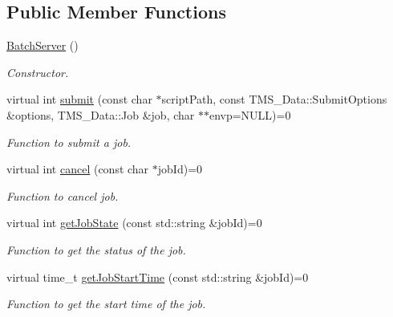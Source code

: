 \subsection*{Public Member Functions}
\begin{DoxyCompactItemize}
\item 
\hypertarget{classBatchServer_a7bacd852b35c5376a3d23a5744f7cf3f}{
\hyperlink{classBatchServer_a7bacd852b35c5376a3d23a5744f7cf3f}{BatchServer} ()}
\label{classBatchServer_a7bacd852b35c5376a3d23a5744f7cf3f}

\begin{DoxyCompactList}\small\item\em Constructor. \item\end{DoxyCompactList}\item 
virtual int \hyperlink{classBatchServer_a078c0f8605e770c02b8eca0351526f59}{submit} (const char $\ast$scriptPath, const TMS\_\-Data::SubmitOptions \&options, TMS\_\-Data::Job \&job, char $\ast$$\ast$envp=NULL)=0
\begin{DoxyCompactList}\small\item\em Function to submit a job. \item\end{DoxyCompactList}\item 
virtual int \hyperlink{classBatchServer_af40bbd83fa2bd1f1720e29800227cdb0}{cancel} (const char $\ast$jobId)=0
\begin{DoxyCompactList}\small\item\em Function to cancel job. \item\end{DoxyCompactList}\item 
virtual int \hyperlink{classBatchServer_ac82e407645e4ad185cf59edcee832d58}{getJobState} (const std::string \&jobId)=0
\begin{DoxyCompactList}\small\item\em Function to get the status of the job. \item\end{DoxyCompactList}\item 
virtual time\_\-t \hyperlink{classBatchServer_aa43eebf4a61d0d61646b7595630d2ef1}{getJobStartTime} (const std::string \&jobId)=0
\begin{DoxyCompactList}\small\item\em Function to get the start time of the job. \item\end{DoxyCompactList}\item 
$$
\end{DoxyCompactItemize}
